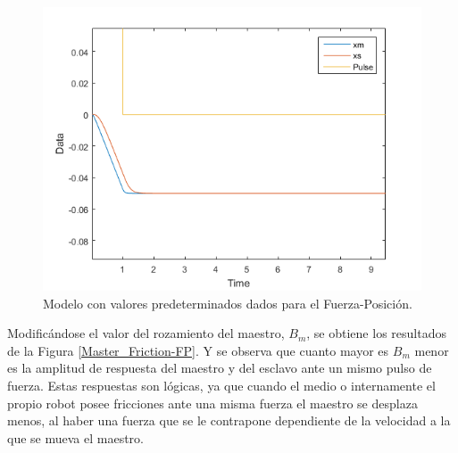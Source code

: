 \documentclass[a4paper, fontsize=11pt]{scrartcl} %
\numberwithin{equation}{section} %
\numberwithin{figure}{section} %
\numberwithin{table}{section} %
\begin{document}
	\begin{figure}[h]
		\centering
		\includegraphics[width=0.5\linewidth]{images/Predet2.PNG}
		\caption{Modelo con valores predeterminados dados para el Fuerza-Posición.}
		\label{Predet Values F-P}
	\end{figure}
	\FloatBarrier
	
	Modificándose el valor del rozamiento del maestro, $B_m$, se obtiene los resultados de la Figura \ref{Master_Friction-FP}. Y se observa que cuanto mayor es $B_m$ menor es la amplitud de respuesta del maestro y del esclavo ante un mismo pulso de fuerza. Estas respuestas son lógicas, ya que cuando el medio o internamente el propio robot posee fricciones ante una misma fuerza el maestro se desplaza menos, al haber una fuerza que se le contrapone dependiente de la velocidad a la que se mueva el maestro.\\
	
\end{document}
